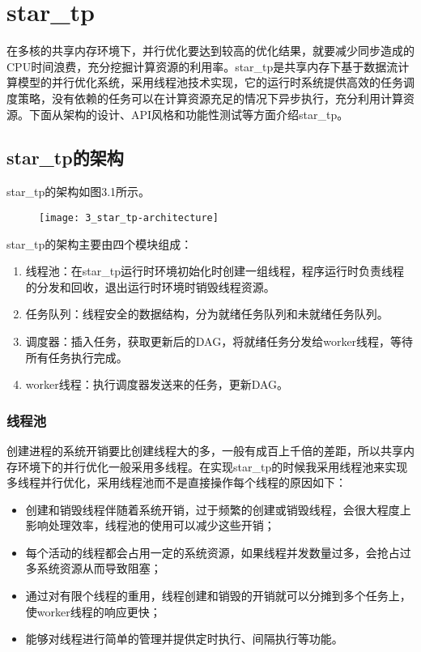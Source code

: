 
\chapter{star\_tp}
\label{chap:startp3}

在多核的共享内存环境下，并行优化要达到较高的优化结果，就要减少同步造成的CPU时间浪费，充分挖掘计算资源的利用率。star\_tp是共享内存下基于数据流计算模型的并行优化系统，采用线程池技术实现，它的运行时系统提供高效的任务调度策略，没有依赖的任务可以在计算资源充足的情况下异步执行，充分利用计算资源。下面从架构的设计、API风格和功能性测试等方面介绍star\_tp。

\section{star\_tp的架构}

star\_tp的架构如图3.1所示。

\begin{figure}[!htbp]
    \centering
    \texttt{[image: 3\_star\_tp-architecture]}
    \label{fig:3_star_tp-architecture}
\end{figure}

star\_tp的架构主要由四个模块组成：

\begin{enumerate}
	\item 线程池：在star\_tp运行时环境初始化时创建一组线程，程序运行时负责线程的分发和回收，退出运行时环境时销毁线程资源。
	\item 任务队列：线程安全的数据结构，分为就绪任务队列和未就绪任务队列。
	\item 调度器：插入任务，获取更新后的DAG，将就绪任务分发给worker线程，等待所有任务执行完成。
	\item worker线程：执行调度器发送来的任务，更新DAG。
\end{enumerate}

\subsection{线程池}

创建进程的系统开销要比创建线程大的多，一般有成百上千倍的差距\citep{Ling:2000:AOT:346152.346320}，所以共享内存环境下的并行优化一般采用多线程。在实现star\_tp的时候我采用线程池来实现多线程并行优化，采用线程池而不是直接操作每个线程的原因如下：

\begin{itemize}
	\item 创建和销毁线程伴随着系统开销，过于频繁的创建或销毁线程，会很大程度上影响处理效率，线程池的使用可以减少这些开销；
	\item 每个活动的线程都会占用一定的系统资源，如果线程并发数量过多，会抢占过多系统资源从而导致阻塞；
	\item 通过对有限个线程的重用，线程创建和销毁的开销就可以分摊到多个任务上，使worker线程的响应更快；
	\item 能够对线程进行简单的管理并提供定时执行、间隔执行等功能。
\end{itemize}

